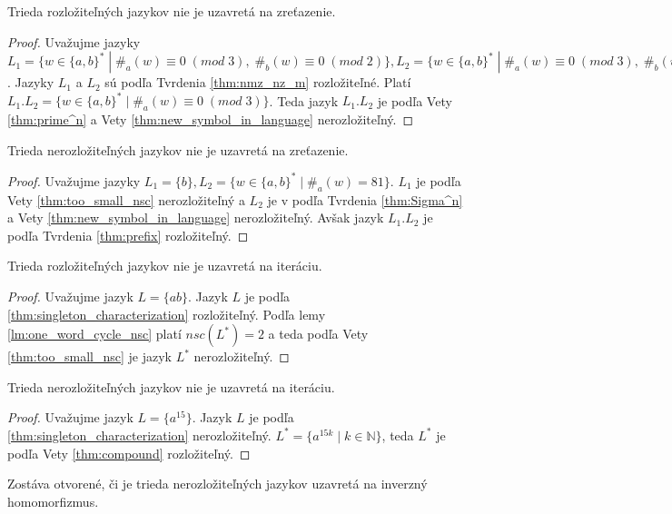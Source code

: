 \begin{proposition}
Trieda rozložiteľných jazykov nie je uzavretá na zreťazenie.
\end{proposition}

\begin{proof}
Uvažujme jazyky $ L_1 = \lbrace w \in \lbrace a,b \rbrace^* \; | \; \#_a(w) \equiv 0 \;  (mod \; 3), \; \#_b(w) \equiv 0 \; (mod \; 2) \rbrace, L_2 = \lbrace w \in \lbrace a,b \rbrace^* \; | \; \#_a(w) \equiv 0 \; (mod \; 3), \; \#_b(w) \equiv 1 \; (mod \; 2) \rbrace \cup \lbrace \varepsilon \rbrace $. Jazyky $ L_1 $ a $ L_2 $ sú podľa Tvrdenia \ref{thm:nmz_nz_m} rozložiteľné. Platí $ L_1.L_2 = \lbrace w \in \lbrace a,b \rbrace^* \; | \; \#_a(w) \equiv 0 \; (mod \; 3) \rbrace $. Teda jazyk $ L_1.L_2 $ je podľa Vety \ref{thm:prime^n} a Vety \ref{thm:new_symbol_in_language} nerozložiteľný.
\end{proof}

\begin{proposition}
Trieda nerozložiteľných jazykov nie je uzavretá na zreťazenie.
\end{proposition}

\begin{proof}
Uvažujme jazyky $ L_1 = \lbrace b \rbrace, L_2 = \lbrace w \in \lbrace a,b \rbrace^* \; | \; \#_a(w) = 81 \rbrace $. $ L_1 $ je podľa Vety \ref{thm:too_small_nsc} nerozložiteľný a $ L_2 $ je v podľa Tvrdenia \ref{thm:Sigma^n} a Vety \ref{thm:new_symbol_in_language} nerozložiteľný. Avšak jazyk $ L_1.L_2 $ je podľa Tvrdenia \ref{thm:prefix} rozložiteľný.
\end{proof}

\begin{proposition}
Trieda rozložiteľných jazykov nie je uzavretá na iteráciu.
\end{proposition}

\begin{proof}
Uvažujme jazyk $ L = \lbrace ab \rbrace $. Jazyk $ L $ je podľa \ref{thm:singleton_characterization} rozložiteľný. Podľa lemy \ref{lm:one_word_cycle_nsc} platí $ nsc(L^*)=2 $ a teda podľa Vety \ref{thm:too_small_nsc} je jazyk $ L^* $ nerozložiteľný.
\end{proof}

\begin{proposition}
Trieda nerozložiteľných jazykov nie je uzavretá na iteráciu.
\end{proposition}

\begin{proof}
Uvažujme jazyk $ L = \lbrace a^{15} \rbrace $. Jazyk $ L $ je podľa \ref{thm:singleton_characterization} nerozložiteľný. $ L^* = \lbrace a^{15k} \; | \; k \in \mathbb{N} \rbrace $, teda $ L^* $ je podľa Vety \ref{thm:compound} rozložiteľný.
\end{proof}

Zostáva otvorené, či je trieda nerozložiteľných jazykov uzavretá na inverzný homomorfizmus.












